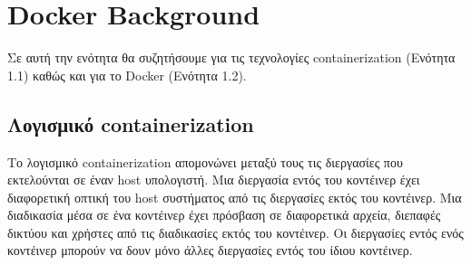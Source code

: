 \chapter{\textlatin{Docker Background}}
\label{dockerBackground}

Σε αυτή την ενότητα θα συζητήσουμε για τις τεχνολογίες
\textlatin{containerization} (Ενότητα 1.1) καθώς και για το
\textlatin{Docker} (Ενότητα 1.2).


\section{Λογισμικό \textlatin{containerization}}

Το λογισμικό \textlatin{containerization} απομονώνει μεταξύ τους τις διεργασίες
που εκτελούνται σε έναν \textlatin{host} υπολογιστή. Μια διεργασία εντός του
κοντέινερ έχει διαφορετική οπτική του \textlatin{host} συστήματος από τις
διεργασίες εκτός του κοντέινερ. Μια διαδικασία μέσα σε ένα κοντέινερ έχει
πρόσβαση σε διαφορετικά αρχεία, διεπαφές δικτύου και χρήστες από τις διαδικασίες
εκτός του κοντέινερ. Οι διεργασίες εντός ενός κοντέινερ μπορούν να δουν μόνο
άλλες διεργασίες εντός του ίδιου κοντέινερ.


